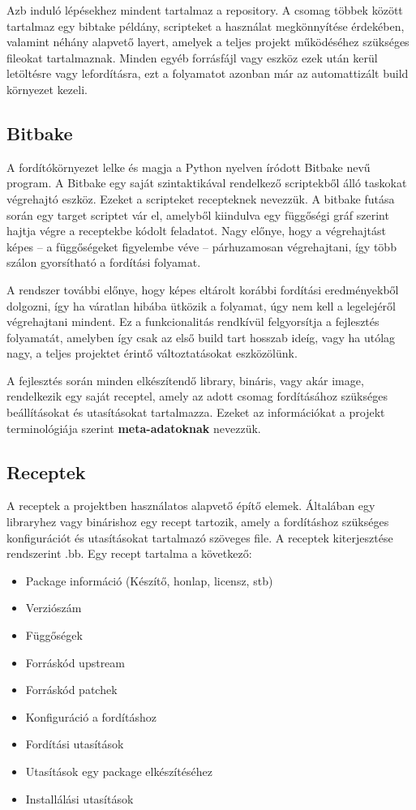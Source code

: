 Azb induló lépésekhez mindent tartalmaz a repository. A csomag többek között tartalmaz egy bibtake példány, scripteket a használat megkönnyítése érdekében, valamint néhány alapvető layert, amelyek a teljes projekt
működéséhez szükséges fileokat tartalmaznak. Minden egyéb forrásfájl vagy eszköz ezek után kerül letöltésre vagy lefordításra, ezt a folyamatot azonban már az automattizált build környezet kezeli.

\subsection{Bitbake}

A fordítókörnyezet lelke és magja a Python nyelven íródott Bitbake nevű program. A Bitbake egy saját szintaktikával rendelkező scriptekből álló taskokat végrehajtó eszköz. Ezeket a scripteket recepteknek nevezzük.
A bitbake futása során egy target scriptet vár el, amelyből kiindulva egy függőségi gráf szerint hajtja végre a receptekbe kódolt feladatot. Nagy előnye, hogy a végrehajtást képes -- a függőségeket figyelembe véve --
párhuzamosan végrehajtani, így több szálon gyorsítható a fordítási folyamat.

A rendszer további előnye, hogy képes eltárolt korábbi fordítási eredményekből dolgozni, így ha váratlan hibába ütközik a folyamat, úgy nem kell a legelejéről végrehajtani mindent. Ez a funkcionalitás rendkívül felgyorsítja
a fejlesztés folyamatát, amelyben így csak az első build tart hosszab ideíg, vagy ha utólag nagy, a teljes projektet érintő változtatásokat eszközölünk.

A fejlesztés során minden elkészítendő library, bináris, vagy akár image, rendelkezik egy saját receptel, amely az adott csomag fordításához szükséges beállításokat és utasításokat tartalmazza. Ezeket az információkat a projekt
terminológiája szerint \textbf{meta-adatoknak} nevezzük.

\subsection{Receptek}

A receptek a projektben használatos alapvető építő elemek. Általában egy libraryhez vagy binárishoz egy recept tartozik, amely a fordításhoz szükséges konfigurációt és utasításokat tartalmazó szöveges file.
A receptek kiterjesztése rendszerint .bb. Egy recept tartalma a következő:

\begin{itemize}
\item Package információ (Készítő, honlap, licensz, stb)
\item Verziószám
\item Függőségek
\item Forráskód upstream
\item Forráskód patchek
\item Konfiguráció a fordításhoz
\item Fordítási utasítások
\item Utasítások egy package elkészítéséhez
\item Installálási utasítások
\end{itemize}

